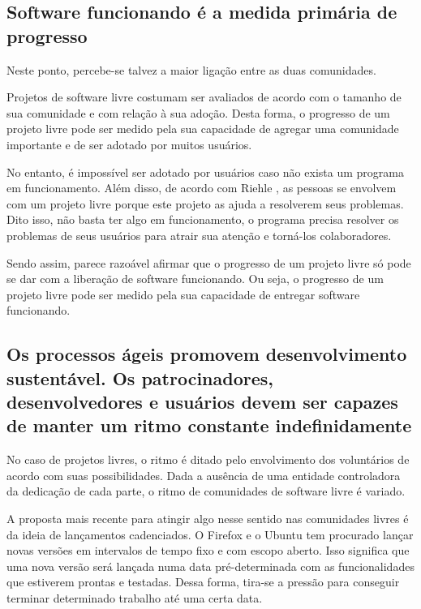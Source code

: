 \subsection[Software funcionando]{Software funcionando é a medida
  primária de progresso}

Neste ponto, percebe-se talvez a maior ligação entre as duas
comunidades.

Projetos de software livre costumam ser avaliados de acordo com o
tamanho de sua comunidade e com relação à sua adoção. Desta forma, o
progresso de um projeto livre pode ser medido pela sua capacidade de
agregar uma comunidade importante e de ser adotado por muitos
usuários.

No entanto, é impossível ser adotado por usuários caso não exista um
programa em funcionamento. Além disso, de acordo com Riehle
\cite{Riehle2007}, as pessoas se envolvem com um projeto livre porque
este projeto as ajuda a resolverem seus problemas. Dito isso, não
basta ter algo em funcionamento, o programa precisa resolver os
problemas de seus usuários para atrair sua atenção e torná-los
colaboradores.

Sendo assim, parece razoável afirmar que o progresso de um projeto
livre só pode se dar com a liberação de software funcionando. Ou seja,
o progresso de um projeto livre pode ser medido pela sua capacidade de
entregar software funcionando.

\subsection[Ritmo sustentável]{Os processos ágeis promovem
  desenvolvimento sustentável. Os patrocinadores, desenvolvedores e
  usuários devem ser capazes de manter um ritmo constante
  indefinidamente}

No caso de projetos livres, o ritmo é ditado pelo envolvimento dos
voluntários de acordo com suas possibilidades. Dada a ausência de uma
entidade controladora da dedicação de cada parte, o ritmo de
comunidades de software livre é variado.

A proposta mais recente para atingir algo nesse sentido nas
comunidades livres é da ideia de lançamentos cadenciados. O Firefox e
o Ubuntu tem procurado lançar novas versões em intervalos de tempo
fixo e com escopo aberto. Isso significa que uma nova versão será
lançada numa data pré-determinada com as funcionalidades que estiverem
prontas e testadas.  Dessa forma, tira-se a pressão para conseguir
terminar determinado trabalho até uma certa data.

